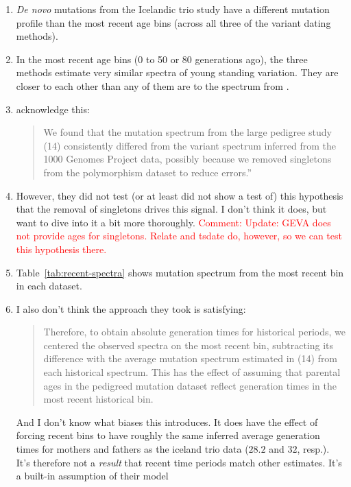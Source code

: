 \documentclass[]{article}
\newcommand{\comment}[1]{{\textcolor{red}{Comment: #1}}}
\begin{document}
\begin{enumerate}
    \item \emph{De novo} mutations from the Icelandic trio study have
        a different mutation profile than the most recent age bins
        (across all three of the variant dating methods).
    \item In the most recent age bins (0 to 50 or 80 generations ago),
        the three methods estimate very similar spectra of young standing
        variation. They are closer to each other than any of them are
        to the spectrum from \citet{jonsson2017parental}.
    \item \citet{wang2023human} acknowledge this:
        \begin{quote}
            We found that the mutation spectrum from the large pedigree study
            (14) consistently differed from the variant spectrum inferred from
            the 1000 Genomes Project data, possibly because we removed
            singletons from the polymorphism dataset to reduce errors.''
        \end{quote}
    \item However, they did not test (or at least did not show a test of)
        this hypothesis that the removal of singletons drives this signal.
        I don't think it does, but want to dive into it a bit more
        thoroughly.
        \comment{Update: GEVA does not provide ages for singletons. Relate
            and tsdate do, however, so we can test this hypothesis there.}
    \item Table~\ref{tab:recent-spectra} shows mutation spectrum from the
        most recent bin in each dataset.
    \item I also don't think the approach they took is satisfying:
        \begin{quote}
            Therefore, to obtain absolute generation times for historical
            periods, we centered the observed spectra on the most recent bin,
            subtracting its difference with the average mutation spectrum
            estimated in (14) from each historical spectrum.  This has the
            effect of assuming that parental ages in the pedigreed mutation
            dataset reflect generation times in the most recent historical bin.
        \end{quote}
        And I don't know what biases this introduces. It does have the effect
        of forcing recent bins to have roughly the same inferred average
        generation times for mothers and fathers as the iceland trio data
        ($28.2$ and $32$, resp.). It's therefore not a \emph{result} that
        recent time periods match other estimates. It's a built-in assumption
        of their model
\end{enumerate}
\end{document}
